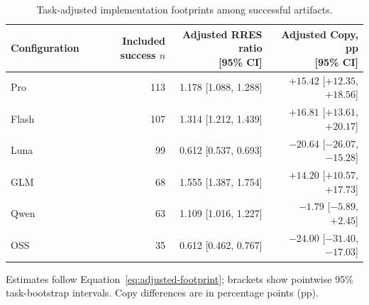 \begin{table}[tbp]
  \centering
  \footnotesize
  \caption{Task-adjusted implementation footprints among successful artifacts.}
  \label{tab:matched-footprint}
  \begin{tabularx}{\linewidth}{@{}Xrrr@{}}
    \toprule
    Configuration & \shortstack{Included\\success $n$} & \shortstack{Adjusted RRES ratio\\{[95\% CI]}} & \shortstack{Adjusted Copy, pp\\{[95\% CI]}} \\
    \midrule
    Pro & 113 & 1.178 [1.088, 1.288] & $+15.42$ [$+12.35$, $+18.56$] \\
    Flash & 107 & 1.314 [1.212, 1.439] & $+16.81$ [$+13.61$, $+20.17$] \\
    Luna & 99 & 0.612 [0.537, 0.693] & $-20.64$ [$-26.07$, $-15.28$] \\
    GLM & 68 & 1.555 [1.387, 1.754] & $+14.20$ [$+10.57$, $+17.73$] \\
    Qwen & 63 & 1.109 [1.016, 1.227] & $-1.79$ [$-5.89$, $+2.45$] \\
    OSS & 35 & 0.612 [0.462, 0.767] & $-24.00$ [$-31.40$, $-17.03$] \\
    \bottomrule
  \end{tabularx}
  \par\smallskip\begin{minipage}{\linewidth}\scriptsize
  Estimates follow Equation~\ref{eq:adjusted-footprint}; brackets show pointwise 95\% task-bootstrap intervals. Copy differences are in percentage points (pp).
  \end{minipage}
\end{table}
